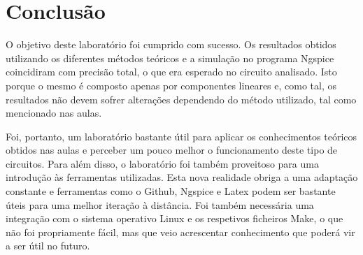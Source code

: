 \section{Conclusão}
\label{sec:conclusao}

O objetivo deste laboratório foi cumprido com sucesso. Os resultados obtidos utilizando os diferentes métodos teóricos e a simulação no programa Ngspice coincidiram com precisão total, o que era esperado no circuito analisado. Isto porque o mesmo é composto apenas por componentes lineares e, como tal, os resultados não devem sofrer alterações dependendo do método utilizado, tal como mencionado nas aulas. \par
Foi, portanto, um laboratório bastante útil para aplicar os conhecimentos teóricos obtidos nas aulas e perceber um pouco melhor o funcionamento deste tipo de circuitos. Para além disso, o laboratório foi também proveitoso para uma introdução às ferramentas utilizadas. Esta nova realidade obriga a uma adaptação constante e ferramentas como o Github, Ngspice e Latex podem ser bastante úteis para uma melhor iteração à distância. Foi também necessária uma integração com o sistema operativo Linux e os respetivos ficheiros Make, o que não foi propriamente fácil, mas que veio acrescentar conhecimento que poderá vir a ser útil no futuro. 


